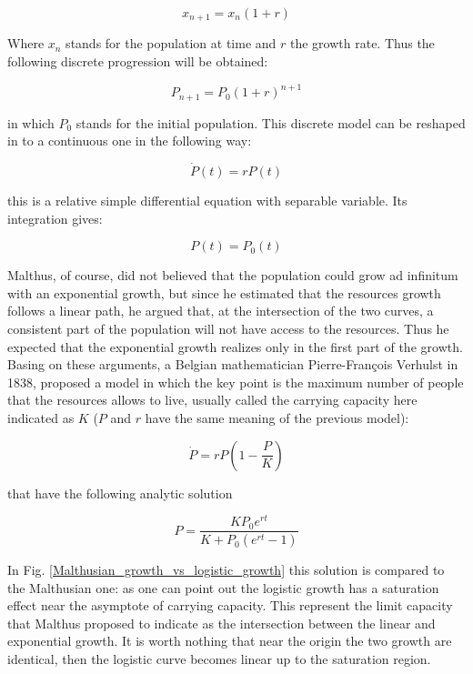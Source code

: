 \documentclass[
12pt, %
a4paper, %
oneside, %
headinclude,footinclude, %
BCOR5mm, %
]{scrartcl}
\begin{document}
\begin{equation}
x_{n+1}=x_{n}(1+r)
\end{equation}

Where $x_{n}$ stands for the population at time and $r$ the growth rate. Thus the following discrete progression will be obtained: 

\begin{equation}
P_{n+1}=P_{0}(1+r)^{n+1}
\end{equation}

in which $P_{0}$ stands for the initial population. This discrete model can be reshaped in to a continuous one in the following way: 

\begin{equation}
\dot{P}(t)=rP(t)
\end{equation}

this is a relative simple differential equation with separable variable. Its integration gives:

\begin{equation}
P(t)=P_{0}(t)
\end{equation}

Malthus, of course, did not believed that the population could grow ad infinitum with an exponential growth, but since he estimated that the resources growth follows a linear path, he argued that, at the intersection of the two curves, a consistent part of the population will not have access to the resources. Thus  he expected that the exponential growth realizes only in the first part of the growth. Basing on these arguments, a Belgian mathematician Pierre-François Verhulst in 1838, proposed a model \cite{verhulst1838notice} in which the key point is the maximum number of people that the resources allows to live, usually called the carrying capacity here indicated as $K$ ($P$ and $r$ have the same meaning of the previous model):

\begin{equation}
\dot{P}=rP\left(1-\dfrac{P}{K} \right)
\end{equation}

that have the following analytic solution 

\begin{equation}
P=\dfrac{KP_{0}e^{rt}}{K+P_{0}(e^{rt}-1)}
\label{logistic_equation}
\end{equation}

In Fig. \ref{Malthusian_growth_vs_logistic_growth} this solution is compared to the Malthusian one: as one can point out the logistic growth has a saturation effect near the asymptote of carrying capacity. This represent the limit capacity that Malthus proposed to indicate as the intersection between the linear and exponential growth. It is worth nothing that near the origin the two growth are identical, then the logistic curve becomes linear up to the saturation region. 
\end{document}
